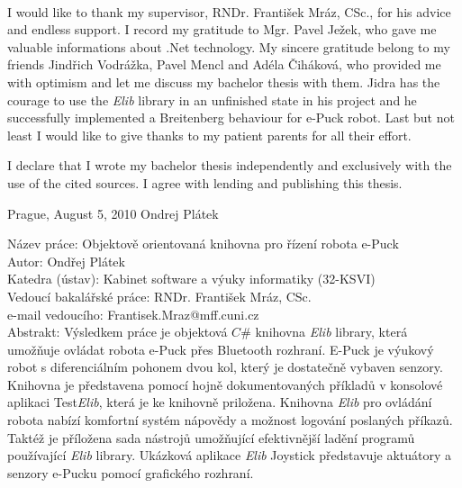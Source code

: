 \documentclass[12pt,notitlepage]{report}
\begin{document}
\normalsize %
\ \vspace{10mm} 

\noindent I would like to thank my supervisor, RNDr. František Mráz, CSc., for his
advice and endless support. I record my gratitude to Mgr. Pavel Ježek, who gave me 
valuable informations about .Net technology. 
My sincere gratitude belong to my friends Jindřich Vodrážka, Pavel Mencl and Adéla Čiháková,
who provided me with optimism and let me discuss my bachelor thesis with them.
Jidra has the courage to use the {\it Elib} library in an unfinished state in his project and
he successfully implemented a Breitenberg behaviour for e-Puck robot.
Last but not least I would like to give thanks to my patient parents for all their effort.

\vspace{\fill} %
\noindent I declare that I wrote my bachelor thesis independently and exclusively with the
use of the cited sources. I agree with lending and publishing this thesis.


\noindent Prague, August 5, 2010 \hspace{\fill}Ondrej Plátek 


\tableofcontents %

\setcounter{page}{2} %
\newpage %

\noindent
Název práce: Objektově orientovaná knihovna pro řízení robota e-Puck\\
Autor: Ondřej Plátek\\
Katedra (ústav): Kabinet software a výuky informatiky (32-KSVI)\\
Vedoucí bakalářské práce: RNDr. František Mráz, CSc.\\
e-mail vedoucího: Frantisek.Mraz@mff.cuni.cz\\

\noindent Abstrakt:  Výsledkem práce je objektová $C\#$ knihovna {\it Elib} library, která umožňuje
ovládat robota e-Puck přes Bluetooth rozhraní.
E-Puck je  výukový robot s diferenciálním pohonem dvou kol, který je dostatečně vybaven senzory.
Knihovna je představena pomocí hojně dokumentovaných příkladů v konsolové aplikaci Test{\it Elib}, která je ke knihovně priložena.
Knihovna {\it Elib} pro ovládání robota nabízí komfortní systém nápovědy a možnost logování
poslaných příkazů.
Taktéž je příložena sada nástrojů umožňující efektivnější ladění programů používající {\it Elib} library.
Ukázková aplikace {\it Elib} Joystick představuje aktuátory a senzory e-Pucku pomocí grafického rozhraní.
\end{document}

